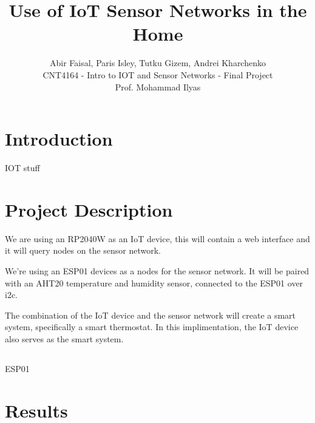 \documentclass[journal]{IEEEtran} %
\title{
    Use of IoT Sensor Networks in the Home \\
    }
\author{
    Abir Faisal, Paris Isley, Tutku Gizem, Andrei Kharchenko \\
    \small CNT4164 - Intro to IOT and Sensor Networks - Final Project \\
    \small Prof. Mohammad Ilyas
    }
\begin{document}

\section{Introduction}

IOT stuff \cite{name2025company}

\section{Project Description}

We are using an RP2040W as an IoT device, this will contain a web interface and it will
query nodes on the sensor network.

We're using an ESP01 devices as a nodes for the sensor network.
It will be paired with an AHT20 temperature and humidity sensor, connected to the ESP01 over i2c.

The combination of the IoT device and the sensor network will create a smart system, specifically a smart thermostat.
In this implimentation, the IoT device also serves as the smart system.

\subsection{}

ESP01


\section{Results}
\end{document}
